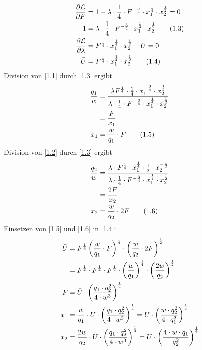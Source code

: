 \documentclass{article}
\begin{document}
\begin{enumerate}[label=(\alph*)]
\begin{align}
			\frac{\partial\mathcal{L}}{\partial F} &= 1- \lambda\cdot\frac{1}{4}\cdot F^{-\frac{3}{4}}\cdot x_1^\frac{1}{4}\cdot x_2^\frac{1}{2} = 0 \notag \\
			\label{1.3}
			1 &= \lambda\cdot\frac{1}{4}\cdot F^{-\frac{3}{4}}\cdot x_1^\frac{1}{4}\cdot x_2^\frac{1}{2} \tag{1.3} \\
			\frac{\partial\mathcal{L}}{\partial\lambda} &= F^\frac{1}{4}\cdot x_1^\frac{1}{4}\cdot x_2^\frac{1}{2} - \bar{U} = 0 \notag \\
			\label{1.4}
			\bar{U} &= F^\frac{1}{4}\cdot x_1^\frac{1}{4}\cdot x_2^\frac{1}{2} \tag{1.4}
		\end{align}
		Division von \eqref{1.1} durch \eqref{1.3} ergibt
		\begin{align}
			\frac{q_1}{w} &= \frac{\lambda F^\frac{1}{4}\cdot \frac{1}{4}\cdot x_1^{-\frac{3}{4}}\cdot x_2^\frac{1}{2}}{\lambda\cdot\frac{1}{4}\cdot F^{-\frac{3}{4}}\cdot x_1^\frac{1}{4}\cdot x_2^\frac{1}{2}} \notag \\
			&= \frac{F}{x_1} \notag \\
			\label{1.5}
			x_1 &= \frac{w}{q_1}\cdot F \tag{1.5}
		\end{align}
		Division von \eqref{1.2} durch \eqref{1.3} ergibt
		\begin{align}
			\frac{q_2}{w} &= \frac{\lambda\cdot F^\frac{1}{4}\cdot x_1^\frac{1}{4}\cdot\frac{1}{2}\cdot x_2^{-\frac{1}{2}}}{\lambda\cdot\frac{1}{4}\cdot F^{-\frac{3}{4}}\cdot x_1^\frac{1}{4}\cdot x_2^\frac{1}{2}} \notag \\
			&= \frac{2F}{x_2} \notag \\
			\label{1.6}
			x_2 &= \frac{w}{q_2}\cdot 2F \tag{1.6}
		\end{align}
		Einsetzen von \eqref{1.5} und \eqref{1.6} in \eqref{1.4}:
		\begin{align}
			\bar{U} &= F^\frac{1}{4}\left(\frac{w}{q_1}\cdot F\right)^\frac{1}{4}\cdot \left(\frac{w}{q_2}\cdot 2F\right)^\frac{1}{2} \notag \\
			&= F^\frac{1}{4}\cdot F^\frac{1}{4}\cdot F^\frac{1}{2}\cdot\left(\frac{w}{q_1}\right)^\frac{1}{4}\cdot\left(\frac{2w}{q_2}\right)^\frac{1}{2} \notag \\
			F &= \bar{U}\cdot\left(\frac{q_1\cdot q_2^2}{4\cdot w^3}\right)^\frac{1}{4} \notag \\
			x_1 &= \frac{w}{q_1}\cdot U \cdot \left(\frac{q_1\cdot q_2^2}{4\cdot w^3}\right)^\frac{1}{4} = \bar{U}\cdot\left(\frac{w\cdot q_2^2}{4\cdot q_1^3}\right)^\frac{1}{4} \notag \\
			x_2 &= \frac{2w}{q_2}\cdot \bar{U}\cdot \left(\frac{q_1\cdot q_2^2}{4\cdot w^3}\right)^\frac{1}{4} = \bar{U}\cdot\left(\frac{4\cdot w\cdot q_1}{q_2^2}\right)^\frac{1}{4} \notag

\end{align}
\end{enumerate}
\end{document}
